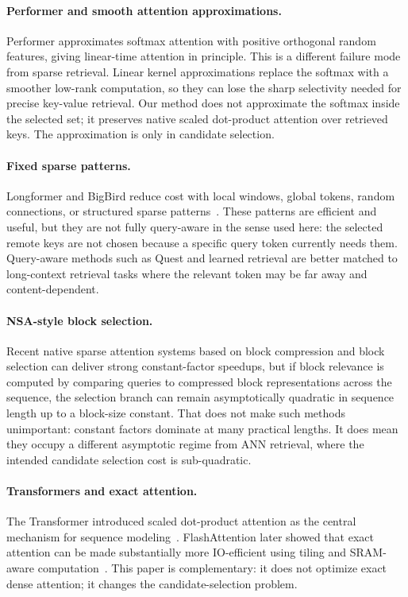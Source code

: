\documentclass[10pt]{article}
\begin{document}
\paragraph{Performer and smooth attention approximations.}
Performer approximates softmax attention with positive orthogonal random
features, giving linear-time attention in principle. This is a different
failure mode from sparse retrieval. Linear kernel approximations replace the
softmax with a smoother low-rank computation, so they can lose the sharp
selectivity needed for precise key-value retrieval. Our method does not
approximate the softmax inside the selected set; it preserves native scaled
dot-product attention over retrieved keys. The approximation is only in
candidate selection.

\paragraph{Fixed sparse patterns.}
Longformer and BigBird reduce cost with local windows, global tokens, random
connections, or structured sparse patterns~\citep{beltagy2020longformer,zaheer2020bigbird}.
These patterns are efficient and useful, but they are not fully query-aware in
the sense used here: the selected remote keys are not chosen because a specific
query token currently needs them. Query-aware methods such as Quest and learned
retrieval are better matched to long-context retrieval tasks where the relevant
token may be far away and content-dependent.

\paragraph{NSA-style block selection.}
Recent native sparse attention systems based on block compression and block
selection can deliver strong constant-factor speedups, but if block relevance is
computed by comparing queries to compressed block representations across the
sequence, the selection branch can remain asymptotically quadratic in sequence
length up to a block-size constant. That does not make such methods unimportant:
constant factors dominate at many practical lengths. It does mean they occupy a
different asymptotic regime from ANN retrieval, where the intended candidate
selection cost is sub-quadratic.

\paragraph{Transformers and exact attention.}
The Transformer introduced scaled dot-product attention as the central
mechanism for sequence modeling~\citep{vaswani2017attention}. FlashAttention
later showed that exact attention can be made substantially more IO-efficient
using tiling and SRAM-aware computation~\citep{dao2022flashattention}. This
paper is complementary: it does not optimize exact dense attention; it changes
the candidate-selection problem.
\end{document}
